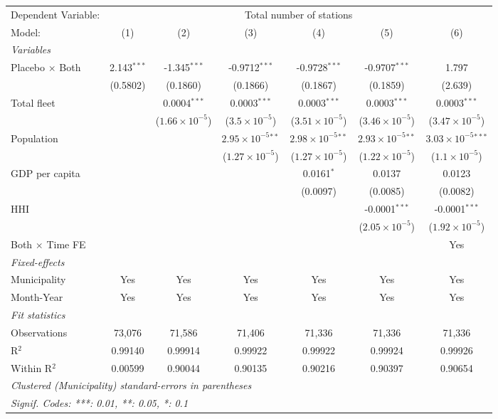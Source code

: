 \documentclass[
]{article}
\begin{document}
\begin{tabular}{lcccccc}
\tabularnewline\midrule\midrule
Dependent Variable:&\multicolumn{6}{c}{Total number of stations}\\
Model:&(1) & (2) & (3) & (4) & (5) & (6)\\
\midrule \emph{Variables}&   &   &   &   &   &  \\
Placebo $\times $ Both & 2.143$^{***}$ & -1.345$^{***}$ & -0.9712$^{***}$ & -0.9728$^{***}$ & -0.9707$^{***}$ & 1.797\\
  &(0.5802) & (0.1860) & (0.1866) & (0.1867) & (0.1859) & (2.639)\\
Total fleet &    & 0.0004$^{***}$ & 0.0003$^{***}$ & 0.0003$^{***}$ & 0.0003$^{***}$ & 0.0003$^{***}$\\
  &   & ($1.66\times 10^{-5}$) & ($3.5\times 10^{-5}$) & ($3.51\times 10^{-5}$) & ($3.46\times 10^{-5}$) & ($3.47\times 10^{-5}$)\\
Population &    &    & $2.95\times 10^{-5}$$^{**}$ & $2.98\times 10^{-5}$$^{**}$ & $2.93\times 10^{-5}$$^{**}$ & $3.03\times 10^{-5}$$^{***}$\\
  &   &    & ($1.27\times 10^{-5}$) & ($1.27\times 10^{-5}$) & ($1.22\times 10^{-5}$) & ($1.1\times 10^{-5}$)\\
GDP per capita &    &    &    & 0.0161$^{*}$ & 0.0137 & 0.0123\\
  &   &    &    & (0.0097) & (0.0085) & (0.0082)\\
HHI &    &    &    &    & -0.0001$^{***}$ & -0.0001$^{***}$\\
  &   &    &    &    & ($2.05\times 10^{-5}$) & ($1.92\times 10^{-5}$)\\
Both $\times$ Time FE &  &  &  &  &  & Yes\\
\midrule \emph{Fixed-effects}&   &   &   &   &   &  \\
Municipality & Yes & Yes & Yes & Yes & Yes & Yes\\
Month-Year & Yes & Yes & Yes & Yes & Yes & Yes\\
\midrule \emph{Fit statistics}&  & & & & & \\
Observations & 73,076&71,586&71,406&71,336&71,336&71,336\\
R$^2$ & 0.99140&0.99914&0.99922&0.99922&0.99924&0.99926\\
Within R$^2$ & 0.00599&0.90044&0.90135&0.90216&0.90397&0.90654\\
\midrule\midrule\multicolumn{7}{l}{\emph{Clustered (Municipality) standard-errors in parentheses}}\\
\multicolumn{7}{l}{\emph{Signif. Codes: ***: 0.01, **: 0.05, *: 0.1}}\\
\end{tabular}
\end{document}

